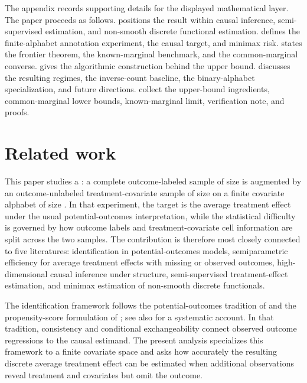 \documentclass[11pt]{article}
\begin{document}
The appendix records supporting details for the displayed mathematical layer. The paper proceeds as follows.  positions the result within causal inference, semi-supervised estimation, and non-smooth discrete functional estimation.  defines the finite-alphabet annotation experiment, the causal target, and minimax risk.  states the frontier theorem, the known-marginal benchmark, and the common-marginal converse.  gives the algorithmic construction behind the upper bound.  discusses the resulting regimes, the inverse-count baseline, the binary-alphabet specialization, and future directions.  collect the upper-bound ingredients, common-marginal lower bounds, known-marginal limit, verification note, and proofs.


\section{Related work}\label{sec:related-work}

This paper studies a : a complete outcome-labeled sample of size  is augmented by an outcome-unlabeled treatment-covariate sample of size  on a finite covariate alphabet of size . In that experiment, the target is the average treatment effect under the usual potential-outcomes interpretation, while the statistical difficulty is governed by how outcome labels and treatment-covariate cell information are split across the two samples. The contribution is therefore most closely connected to five literatures: identification in potential-outcomes models, semiparametric efficiency for average treatment effects with missing or observed outcomes, high-dimensional causal inference under structure, semi-supervised treatment-effect estimation, and minimax estimation of non-smooth discrete functionals.

The identification framework follows the potential-outcomes tradition of \citet{Rubin1974} and the propensity-score formulation of \citet{RosenbaumRubin1983}; see also \citet{ImbensRubin2015} for a systematic account. In that tradition, consistency and conditional exchangeability connect observed outcome regressions to the causal estimand. The present analysis specializes this framework to a finite covariate space and asks how accurately the resulting discrete average treatment effect can be estimated when additional observations reveal treatment and covariates but omit the outcome.
\end{document}
